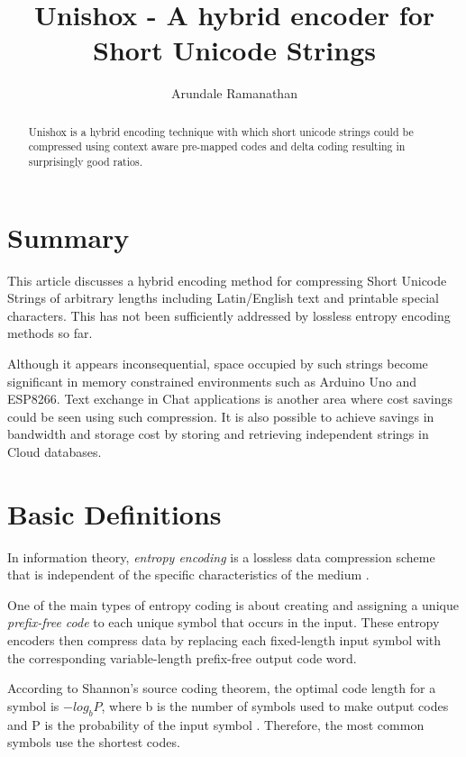 \documentclass[]{article}
\title{Unishox - A hybrid encoder for Short Unicode Strings}
\author{Arundale Ramanathan}
\begin{document}
\maketitle

\begin{abstract}
Unishox is a hybrid encoding technique with which short unicode strings could be compressed using context aware pre-mapped codes and delta coding resulting in surprisingly good ratios.

\end{abstract}

\section{Summary}

This article discusses a hybrid encoding method for compressing Short Unicode Strings of arbitrary lengths including Latin/English text and printable special characters. This has not been sufficiently addressed by lossless entropy encoding methods so far.

Although it appears inconsequential, space occupied by such strings become significant in memory constrained environments such as Arduino Uno and ESP8266. Text exchange in Chat applications is another area where cost savings could be seen using such compression. It is also possible to achieve savings in bandwidth and storage cost by storing and retrieving independent strings in Cloud databases.

\section{Basic Definitions}

In information theory, \emph{entropy encoding} is a lossless data compression scheme that is independent of the specific characteristics of the medium \cite{1}.

One of the main types of entropy coding is about creating and assigning a unique \emph{prefix-free code} to each unique symbol that occurs in the input. These entropy encoders then compress data by replacing each fixed-length input symbol with the corresponding variable-length prefix-free output code word.

According to Shannon's source coding theorem, the optimal code length for a symbol is $-log_bP$, where b is the number of symbols used to make output codes and P is the probability of the input symbol \cite{2}. Therefore, the most common symbols use the shortest codes.
\end{document}
